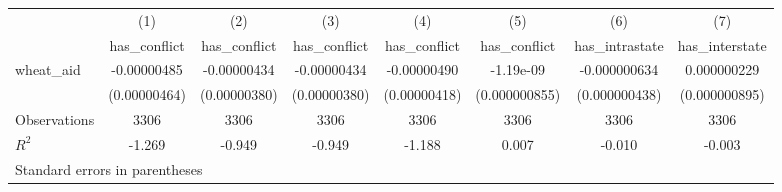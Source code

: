 \begin{tabular}{l*{7}{c}}
\hline\hline
                    &\multicolumn{1}{c}{(1)}&\multicolumn{1}{c}{(2)}&\multicolumn{1}{c}{(3)}&\multicolumn{1}{c}{(4)}&\multicolumn{1}{c}{(5)}&\multicolumn{1}{c}{(6)}&\multicolumn{1}{c}{(7)}\\
                    &\multicolumn{1}{c}{has\_conflict}&\multicolumn{1}{c}{has\_conflict}&\multicolumn{1}{c}{has\_conflict}&\multicolumn{1}{c}{has\_conflict}&\multicolumn{1}{c}{has\_conflict}&\multicolumn{1}{c}{has\_intrastate}&\multicolumn{1}{c}{has\_interstate}\\
\hline
wheat\_aid           & -0.00000485& -0.00000434& -0.00000434& -0.00000490&   -1.19e-09&-0.000000634& 0.000000229\\
                    &(0.00000464)&(0.00000380)&(0.00000380)&(0.00000418)&(0.000000855)&(0.000000438)&(0.000000895)\\
\hline
Observations        &        3306&        3306&        3306&        3306&        3306&        3306&        3306\\
\(R^{2}\)           &      -1.269&      -0.949&      -0.949&      -1.188&       0.007&      -0.010&      -0.003\\
\hline\hline
\multicolumn{8}{l}{\footnotesize Standard errors in parentheses}\\
\end{tabular}

